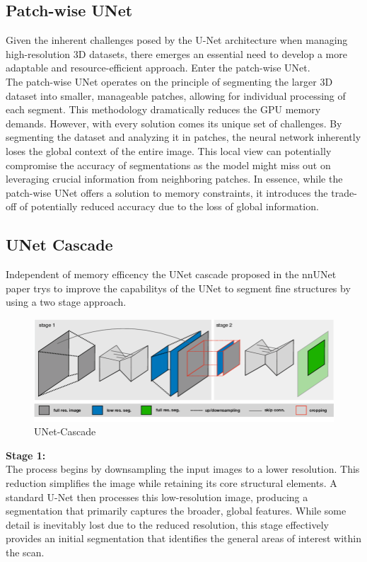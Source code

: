 \subsection{Patch-wise UNet}
Given the inherent challenges posed by the U-Net architecture when managing high-resolution 3D datasets, there emerges an essential need to develop a more adaptable and resource-efficient approach.
Enter the patch-wise UNet.\\
The patch-wise UNet operates on the principle of segmenting the larger 3D dataset into smaller, manageable patches, allowing for individual processing of each segment.
This methodology dramatically reduces the GPU memory demands. However, with every solution comes its unique set of challenges.
By segmenting the dataset and analyzing it in patches, the neural network inherently loses the global context of the entire image.
This local view can potentially compromise the accuracy of segmentations as the model might miss out on leveraging crucial information from neighboring patches.
In essence, while the patch-wise UNet offers a solution to memory constraints, it introduces the trade-off of potentially reduced accuracy due to the loss of global information.

\subsection{UNet Cascade}
Independent of memory efficency the UNet cascade proposed in the nnUNet paper\cite{isensee_nnu-net_2018} trys to improve the capabilitys of the UNet to
segment fine structures by using a two stage approach.

\begin{figure}[!hb]
	\centering
	\includegraphics[width=1\linewidth]{images/UNet-Cascade}
	\caption{UNet-Cascade\cite{simpson_large_2019}}
	\label{fig:UNet-Cascade}
\end{figure}

\noindent\textbf{Stage 1:}\\
The process begins by downsampling the input images to a lower resolution. This reduction simplifies the image while retaining its core structural elements.
A standard U-Net then processes this low-resolution image, producing a segmentation that primarily captures the broader, global features.
While some detail is inevitably lost due to the reduced resolution,
this stage effectively provides an initial segmentation that identifies the general areas of interest within the scan.

